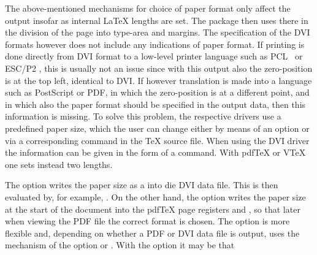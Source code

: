 %
%
\begin{Declaration}
\end{Declaration}%
\begin{Explain}%
  The above-mentioned mechanisms for choice of paper format only
  affect the output insofar as internal {\LaTeX} lengths are set. The
   package then uses there in the division of the
  page into type-area and margins. The specification of the DVI
  formats however does not include any indications of paper
  format. If printing is done directly from DVI format to a low-level
  printer language such as PCL%
  \iffalse%
  \footnote{PCL is the printer language used by HP for its inkjet and
    laser printers.}%
  \fi \ or ESC/P2%
  \iffalse%
  \footnote{ESC/P2 is the printer language used by EPSON for its
    dot-matrix, inkjet and laser printers.}%
  \fi , this is usually not an issue since with this output also the
  zero-position is at the top left, identical to DVI. If however
  translation is made into a language such as
  PostScript or PDF, in which the
  zero-position is at a different point, and in which also the paper
  format should be specified in the output data, then this information
  is missing. To solve this problem, the respective drivers use a
  predefined paper size, which the user can change either by means of
  an option or via a corresponding command in the {\TeX} source
  file. When using the DVI driver  the information can be
  given in the form of a  command. With {pdf\TeX} or
  {V\TeX} one sets instead two lengths.
\end{Explain}
The option 
writes the paper size as a  into die DVI data
file. This  is then evaluated by, for example,
. On the other hand, the option
 writes the paper size at the start of
the document into the {pdf\TeX} page registers
 and
, so that later when
viewing the PDF file the correct format is chosen. The option
 is more flexible and, depending on
whether a PDF or DVI data file is output, uses the mechanism of the
option  or
. With the option
 it may be that 
